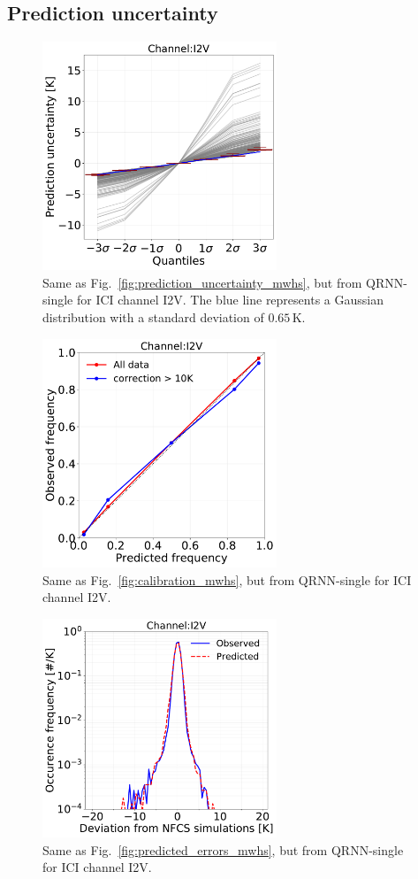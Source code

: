 \documentclass[amt, manuscript]{copernicus}
\begin{document}
\subsection{Prediction uncertainty}
\label{sec:prediction_uncertainty}
\begin{figure}[t]
	\includegraphics[width = 70mm]{Figures/fig09.pdf}	
	\caption{Same as Fig.~\ref{fig:prediction_uncertainty_mwhs}, but from QRNN-single for ICI channel I2V. The blue line represents a Gaussian distribution with a standard deviation of $0.65$\,K.}
	\label{fig:prediction_uncertainty_I2V}	
\end{figure}
\begin{figure}[t]
	\includegraphics[width = 70mm]{Figures/fig10.pdf}	
	\caption{Same as Fig.~\ref{fig:calibration_mwhs}, but from QRNN-single for ICI channel I2V. }
	\label{fig:calibration_I2V}	
\end{figure}
\begin{figure}[t]
	\includegraphics[width= 70mm]{Figures/fig11.pdf}	
	\caption{Same as Fig.~\ref{fig:predicted_errors_mwhs}, but from QRNN-single for ICI channel I2V.}
	\label{fig:predicted_errors}	
\end{figure}
\end{document}
